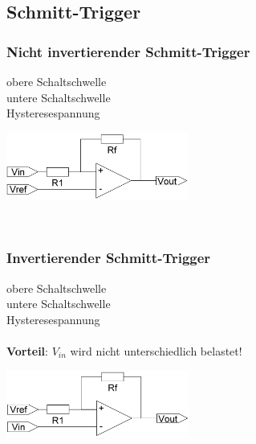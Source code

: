 \subsection{Schmitt-Trigger}
  \subsubsection{Nicht invertierender Schmitt-Trigger}
		\begin{minipage}[T]{13cm}
      obere Schaltschwelle
      \hspace{10.8mm}\\
      untere Schaltschwelle
      \hspace{9.6mm}\\
      Hysteresespannung
      \hspace{12.8mm}\\
    \end{minipage} 
    \begin{minipage}{6cm}
      \includegraphics[width=6cm]{./bilder/n-schmitt.png} 
    \end{minipage}\\
            
  \subsubsection{Invertierender Schmitt-Trigger}
    \begin{minipage}[T]{13cm}
      obere Schaltschwelle
      \hspace{10.8mm}\\
      untere Schaltschwelle
      \hspace{9.6mm}\\
      Hysteresespannung
      \hspace{12.8mm}\\ \\
      \textbf{Vorteil}: $V_{in}$ wird nicht unterschiedlich belastet!
    \end{minipage} 
    \begin{minipage}{6cm}
      \includegraphics[width=6cm]{./bilder/i-schmitt.png} 
    \end{minipage}\\
            
